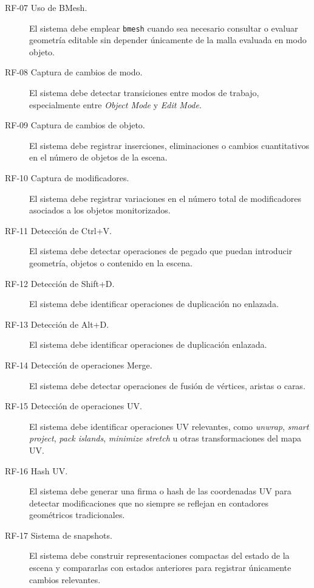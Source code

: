 \begin{description}
    \item[RF-07 Uso de BMesh.] El sistema debe emplear \texttt{bmesh} cuando sea necesario consultar o evaluar geometría editable sin depender únicamente de la malla evaluada en modo objeto.

    \item[RF-08 Captura de cambios de modo.] El sistema debe detectar transiciones entre modos de trabajo, especialmente entre \textit{Object Mode} y \textit{Edit Mode}.

    \item[RF-09 Captura de cambios de objeto.] El sistema debe registrar inserciones, eliminaciones o cambios cuantitativos en el número de objetos de la escena.

    \item[RF-10 Captura de modificadores.] El sistema debe registrar variaciones en el número total de modificadores asociados a los objetos monitorizados.

    \item[RF-11 Detección de Ctrl+V.] El sistema debe detectar operaciones de pegado que puedan introducir geometría, objetos o contenido en la escena.

    \item[RF-12 Detección de Shift+D.] El sistema debe identificar operaciones de duplicación no enlazada.

    \item[RF-13 Detección de Alt+D.] El sistema debe identificar operaciones de duplicación enlazada.

    \item[RF-14 Detección de operaciones Merge.] El sistema debe detectar operaciones de fusión de vértices, aristas o caras.

    \item[RF-15 Detección de operaciones UV.] El sistema debe identificar operaciones UV relevantes, como \textit{unwrap}, \textit{smart project}, \textit{pack islands}, \textit{minimize stretch} u otras transformaciones del mapa UV.

    \item[RF-16 Hash UV.] El sistema debe generar una firma o hash de las coordenadas UV para detectar modificaciones que no siempre se reflejan en contadores geométricos tradicionales.

    \item[RF-17 Sistema de snapshots.] El sistema debe construir representaciones compactas del estado de la escena y compararlas con estados anteriores para registrar únicamente cambios relevantes.


\end{description}
